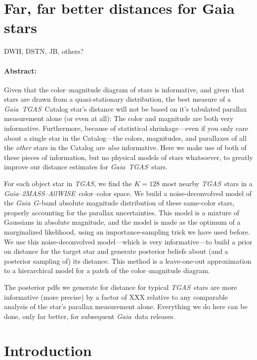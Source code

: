 \documentclass[12pt]{article}
\newcommand{\project}[1]{\textsl{#1}}
\newcommand{\acronym}[1]{\small{#1}}
\newcommand{\gaia}{\project{Gaia}}
\newcommand{\tgas}{\project{\acronym{TGAS}}}
\newcommand{\twomass}{\project{\acronym{2MASS}}}
\newcommand{\wise}{\project{All\acronym{WISE}}}
\begin{document}
\section*{Far, far better distances for Gaia stars}

\noindent
DWH, DSTN, JB, others?

\paragraph{Abstract:}
Given that the color--magnitude diagram of stars is informative, and
given that stars are drawn from a quasi-stationary distribution, the
best measure of a \gaia\ \tgas\ Catalog star's distance will not be based on
it's tabulated parallax measurement alone (or even at all):
The color and magnitude are both very informative.
Furthermore, because of statistical shrinkage---even if you
only care about a single star in the Catalog---the colors, magnitudes,
and parallaxes of all the \emph{other} stars in the Catalog are \emph{also}
informative.
Here we make use of both of these pieces of information, but no
physical models of stars whatsoever, to greatly improve our distance
estimates for \gaia\ \tgas\ stars.

For each object star in \tgas, we find the $K=128$ most nearby \tgas\ stars
in a \gaia--\twomass--\wise\ color--color space.
We build a noise-deconvolved model of the \gaia\ $G$-band absolute
magnitude distribution of these same-color stars, properly accounting
for the parallax uncertainties.
This model is a mixture of Gaussians in absolute magnitude, and the
model is made as the optimum of a marginalized likelihood, using an
importance-sampling trick we have used before.
We use this noise-deconvolved model---which is very informative---to
build a prior on distance for the target star and generate posterior
beliefs about (and a posterior sampling of) its distance.
This method is a leave-one-out approximation to a hierarchical model for
a patch of the color--magnitude diagram.

The posterior pdfs we generate for distance for typical \tgas\ stars
are more informative (more precise) by a factor of XXX relative to any
comparable analysis of the star's parallax measurement alone.
Everything we do here can be done, only far better, for subsequent
\gaia\ data releases.

\section{Introduction}
\end{document}
